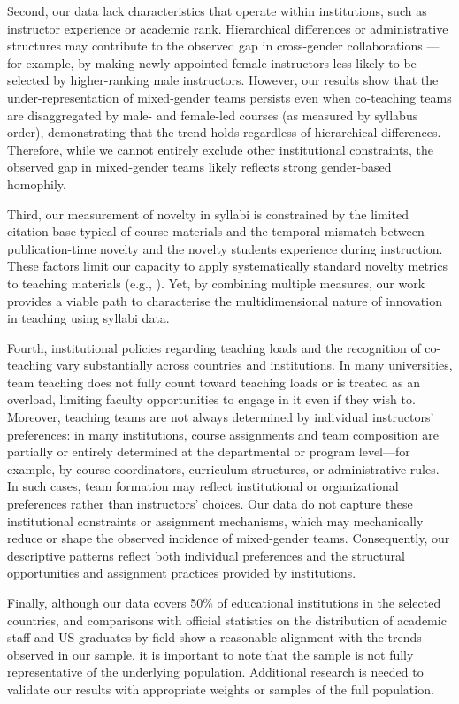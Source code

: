 \documentclass[
  british,
  11pt,
]{article}
\begin{document}
Second, our data lack characteristics that operate within institutions, such as instructor experience or academic rank. Hierarchical differences or administrative structures may contribute to the observed gap in cross-gender collaborations --- for example, by making newly appointed female instructors less likely to be selected by higher-ranking male instructors. However, our results show that the under-representation of mixed-gender teams persists even when co-teaching teams are disaggregated by male- and female-led courses (as measured by syllabus order), demonstrating that the trend holds regardless of hierarchical differences. Therefore, while we cannot entirely exclude other institutional constraints, the observed gap in mixed-gender teams likely reflects strong gender-based homophily.

Third, our measurement of novelty in syllabi is constrained by the limited citation base typical of course materials and the temporal mismatch between publication-time novelty and the novelty students experience during instruction. These factors limit our capacity to apply systematically standard novelty metrics to teaching materials (e.g., ). Yet, by combining multiple measures, our work provides a viable path to characterise the multidimensional nature of innovation in teaching using syllabi data.

Fourth, institutional policies regarding teaching loads and the recognition of co-teaching vary substantially across countries and institutions. In many universities, team teaching does not fully count toward teaching loads or is treated as an overload, limiting faculty opportunities to engage in it even if they wish to. Moreover, teaching teams are not always determined by individual instructors' preferences: in many institutions, course assignments and team composition are partially or entirely determined at the departmental or program level---for example, by course coordinators, curriculum structures, or administrative rules. In such cases, team formation may reflect institutional or organizational preferences rather than instructors' choices. Our data do not capture these institutional constraints or assignment mechanisms, which may mechanically reduce or shape the observed incidence of mixed-gender teams. Consequently, our descriptive patterns reflect both individual preferences and the structural opportunities and assignment practices provided by institutions.

Finally, although our data covers 50\% of educational institutions in the selected countries, and comparisons with official statistics on the distribution of academic staff and US graduates by field show a reasonable alignment with the trends observed in our sample, it is important to note that the sample is not fully representative of the underlying population. Additional research is needed to validate our results with appropriate weights or samples of the full population.
\end{document}
